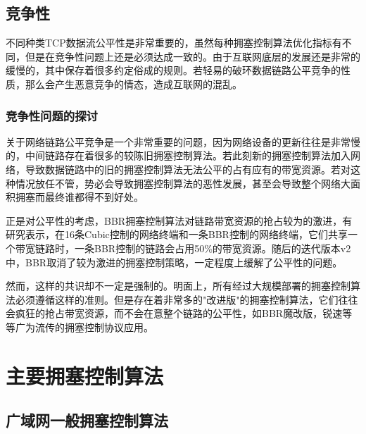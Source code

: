 \documentclass[a4paper, 12pt, UTF8]{ctexart}
\begin{document}
\subsection{竞争性}

\par 不同种类TCP数据流\cite{DBLP:conf/imc/WareMSS19}公平性是非常重要的，虽然每种拥塞控制算法优化指标有不同，但是在竞争性问题上还是必须达成一致的。由于互联网底层的发展还是非常的缓慢的，其中保存着很多约定俗成的规则。若轻易的破环数据链路公平竞争的性质，那么会产生恶意竞争的情态，造成互联网的混乱。

\subsubsection{竞争性问题的探讨}
\par 关于网络链路公平竞争是一个非常重要的问题，因为网络设备的更新往往是非常慢的，中间链路存在着很多的较陈旧拥塞控制算法。若此刻新的拥塞控制算法加入网络，导致数据链路中的旧的拥塞控制算法无法公平的占有应有的带宽资源。若对这种情况放任不管，势必会导致拥塞控制算法的恶性发展，甚至会导致整个网络大面积拥塞而最终谁都得不到好处。

\par 正是对公平性的考虑，BBR拥塞控制算法对链路带宽资源的抢占较为的激进，有研究表示\cite{DBLP:conf/sigcomm/SivaramanWTB14}，在16条Cubic控制的网络终端和一条BBR控制的网络终端，它们共享一个带宽链路时，一条BBR控制的链路会占用50\%的带宽资源。随后的迭代版本v2\cite{bbrv2}中，BBR取消了较为激进的拥塞控制策略，一定程度上缓解了公平性的问题。

\par 然而，这样的共识却不一定是强制的。明面上，所有经过大规模部署的拥塞控制算法必须遵循这样的准则。但是存在着非常多的"改进版"的拥塞控制算法，它们往往会疯狂的抢占带宽资源，而不会在意整个链路的公平性，如BBR魔改版，锐速等等\cite{linux-netspeed}广为流传的拥塞控制协议应用。

\clearpage

\section{主要拥塞控制算法}

\subsection{广域网一般拥塞控制算法}
\end{document}
